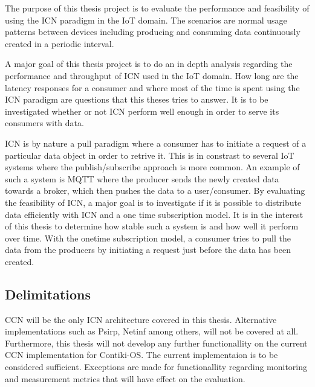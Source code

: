 The purpose of this thesis project is to evaluate the performance and feasibility of using the ICN paradigm in the IoT domain. The scenarios are normal usage patterns between devices including producing and consuming data continuously created in a periodic interval. 

A major goal of this thesis project is to do an in depth analysis regarding the performance and throughput of ICN used in the IoT domain. How long are the latency responses for a consumer and where most of the time is spent using the ICN paradigm are questions that this theses tries to answer. It is to be investigated whether or not ICN perform well enough in order to serve its consumers with data.

ICN is by nature a pull paradigm where a consumer has to initiate a request of a particular data object in order to retrive it. This is in constrast to several IoT systems where the publish/subscribe approach is more common. An example of such a system is MQTT \cite{mqtt} where the producer sends the newly created data towards a broker, which then pushes the data to a user/consumer. %
By evaluating the feasibility of ICN, a major goal is to investigate if it is possible to distribute data efficiently with ICN and a one time subscription model. It is in the interest of this thesis to determine how stable such a system is and how well it perform over time. With the onetime subscription model, a consumer tries to pull the data from the producers by initiating a request just before the data has been created. 



\subsection{Delimitations}
CCN will be the only ICN architecture covered in this thesis. Alternative implementations such as Psirp, Netinf among others, will not be covered at all.
Furthermore, this thesis will not develop any further functionallity on the current CCN implementation for Contiki-OS. The current implementaion is to be considered sufficient. Exceptions are made for functionallity regarding monitoring and measurement metrics that will have effect on the evaluation. 

